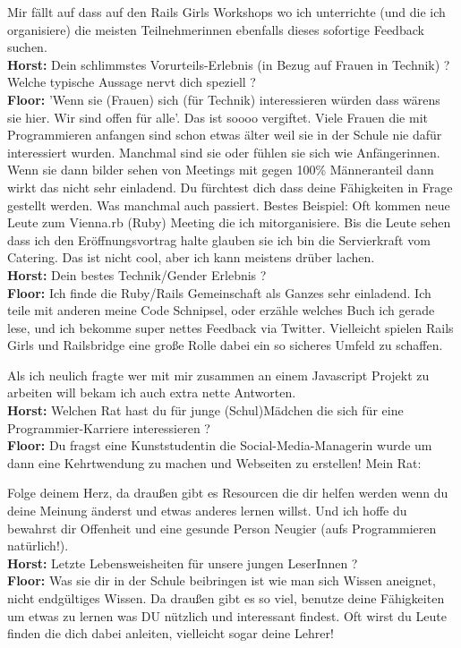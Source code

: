 \documentclass[10pt,a4paper,ngerman,twoside]{article} %
\begin{document}
Mir fällt auf dass auf den Rails Girls Workshops wo ich unterrichte (und die ich organisiere) die meisten Teilnehmerinnen ebenfalls dieses sofortige Feedback suchen. \\
\textbf{Horst:} Dein schlimmstes Vorurteils-Erlebnis (in Bezug auf Frauen in Technik) ? Welche typische Aussage nervt dich speziell ? \\
\textbf{Floor:} 'Wenn sie (Frauen) sich (für Technik) interessieren würden dass wärens sie hier. Wir sind offen für alle'. Das ist soooo vergiftet. Viele Frauen die mit Programmieren anfangen sind schon etwas älter weil sie in der Schule nie dafür interessiert wurden. Manchmal sind sie oder fühlen sie sich wie Anfängerinnen. Wenn sie dann bilder sehen von Meetings mit gegen 100\% Männeranteil dann wirkt das nicht sehr einladend. Du fürchtest dich dass deine Fähigkeiten in Frage gestellt werden. Was manchmal auch passiert. Bestes Beispiel: Oft kommen neue Leute zum Vienna.rb (Ruby) Meeting die ich mitorganisiere. Bis die Leute sehen dass ich den Eröffnungsvortrag halte glauben sie ich bin die Servierkraft vom Catering. Das ist nicht cool, aber ich kann meistens drüber lachen. \\
\textbf{Horst:}  Dein bestes Technik/Gender Erlebnis ? \\
\textbf{Floor:} Ich finde die Ruby/Rails Gemeinschaft als Ganzes sehr einladend. Ich teile mit anderen meine Code Schnipsel, oder erzähle welches Buch ich gerade lese, und ich bekomme super nettes Feedback via Twitter. Vielleicht spielen Rails Girls und Railsbridge eine große Rolle dabei ein so sicheres Umfeld zu schaffen.

Als ich neulich fragte wer mit mir zusammen an einem Javascript Projekt zu arbeiten will bekam ich auch extra nette Antworten. \\
\textbf{Horst:} Welchen Rat hast du für junge (Schul)Mädchen die sich für eine Programmier-Karriere interessieren ? \\
\textbf{Floor:} Du fragst eine Kunststudentin die Social-Media-Managerin wurde um dann eine Kehrtwendung zu machen und Webseiten zu erstellen! Mein Rat: 

Folge deinem Herz, da draußen gibt es Resourcen die dir helfen werden wenn du deine Meinung änderst und etwas anderes lernen willst. Und ich hoffe du bewahrst dir Offenheit und eine gesunde Person Neugier (aufs Programmieren natürlich!). \\
\textbf{Horst:} Letzte Lebensweisheiten für unsere jungen LeserInnen ? \\
\textbf{Floor:} Was sie dir in der Schule beibringen ist wie man sich Wissen aneignet, nicht endgültiges Wissen. Da draußen gibt es so viel, benutze deine Fähigkeiten um etwas zu lernen was DU nützlich und interessant findest. Oft wirst du Leute finden die dich dabei anleiten, vielleicht sogar deine Lehrer!
\end{document}
